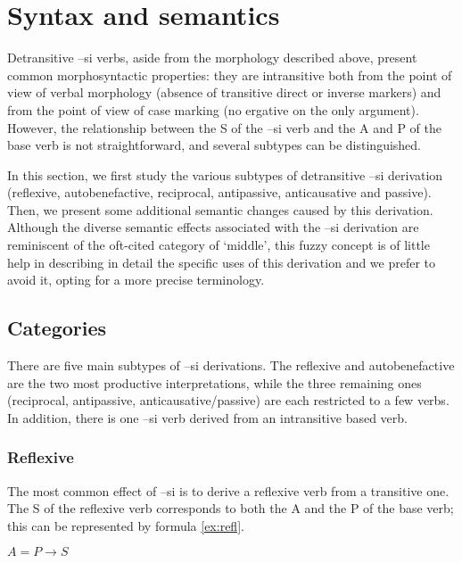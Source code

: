 \documentclass[twoside,a4paper,11pt]{article}
\newcommand{\ipa}[1]{{\phon#1}}
\begin{document}


\section{Syntax and semantics}
Detransitive \ipa{–si}  verbs, aside from the morphology described above, present common morphosyntactic properties: they are intransitive both from the point of view of verbal morphology (absence of transitive direct or inverse markers) and from the point of view of case marking (no ergative on the only argument). However,  the relationship between the S of the \ipa{–si}  verb and the A and P of the base verb is not straightforward, and several subtypes can be distinguished.

In this section, we first study the various subtypes of detransitive \ipa{--si} derivation (reflexive, autobenefactive, reciprocal, antipassive, anticausative and passive). Then, we present some additional semantic changes caused by this derivation. Although the diverse semantic effects associated with the \ipa{--si} derivation are reminiscent of the oft-cited category of `middle', this fuzzy concept is of little help in describing in detail  the specific uses of this derivation and we prefer to avoid it, opting for a more precise terminology.

\subsection{Categories} \label{sec:categories}
There are five main subtypes of \ipa{--si} derivations. The reflexive and autobenefactive are the two most productive interpretations, while the three remaining ones (reciprocal, antipassive, anticausative/passive) are each restricted to a few verbs. In addition, there is one \ipa{--si} verb derived from an intransitive based verb.


\subsubsection{Reflexive}
The most common effect of \ipa{–si} is to derive a reflexive verb from a transitive one. The S of the reflexive verb corresponds to both the A and the P of the base verb; this  can be represented by  formula \ref{ex:refl}.

\begin{exe}
\ex \label{ex:refl}
\glt $A = P \rightarrow S$
\end{exe}
\end{document}
